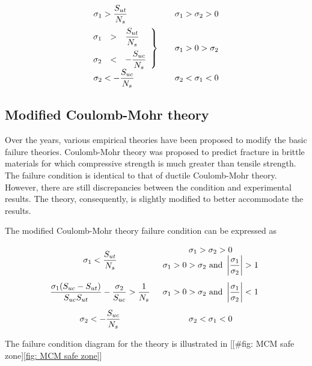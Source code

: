 \documentclass[a4paper,openany,12pt]{book}
\begin{document}
$$\begin{array}{l l l}
  \sigma_1 > \dfrac{S_{ut}}{N_s} & & \sigma_1 > \sigma_2 > 0 \\[10pt]
  \left. \hspace{-0.23cm}
  \begin{array}{l l l}
    \sigma_1 & > & \dfrac{S_{ut}}{N_s} \\[10pt]
    \sigma_2 & < & -\dfrac{S_{uc}}{N_s}
    \end{array} \right\} & & \sigma_1 > 0 > \sigma_2 \\[10pt]
    \sigma_2 <  - \dfrac{S_{uc}}{N_s} & & \sigma _2 < \sigma _1 < 0
  \end{array}$$

\subsection{Modified Coulomb-Mohr theory}
\label{modified-coulomb-mohr-theory}
Over the years, various empirical theories have been proposed to modify
the basic failure theories. Coulomb-Mohr theory was proposed to predict
fracture in brittle materials for which compressive strength is much
greater than tensile strength. The failure condition is identical to
that of ductile Coulomb-Mohr theory. However, there are still
discrepancies between the condition and experimental results. The
theory, consequently, is slightly modified to better accommodate the
results.

The modified Coulomb-Mohr theory failure condition can be expressed as

$$\begin{array}{c c}
    \sigma_1 < \dfrac{S_{ut}}{N_s} &
      \begin{array}{c}
        \sigma_1 > \sigma_2 > 0 \\ 
        \sigma_1 > 0 > \sigma_2 \text{ and } \left| \dfrac{\sigma_1}{\sigma_2} \right| > 1 
      \end{array} \\[20pt]
    \dfrac{\sigma_1(S_{uc} - S_{ut})}{S_{uc}S_{ut}} - \dfrac{\sigma_2}{S_{uc}} >
      \dfrac{1}{N_s} & \sigma_1 > 0 > \sigma_2\text{ and }\left| \dfrac{\sigma_1}{\sigma_2} \right| < 1 \\[15pt]
    \sigma_2 <  -\dfrac{S_{uc}}{N_s} & \sigma_2 < \sigma_1 < 0 
  \end{array}$$

The failure condition diagram for the theory is illustrated in
[[\#fig: MCM safe zone]\ref{fig: MCM safe zone}]
\end{document}
